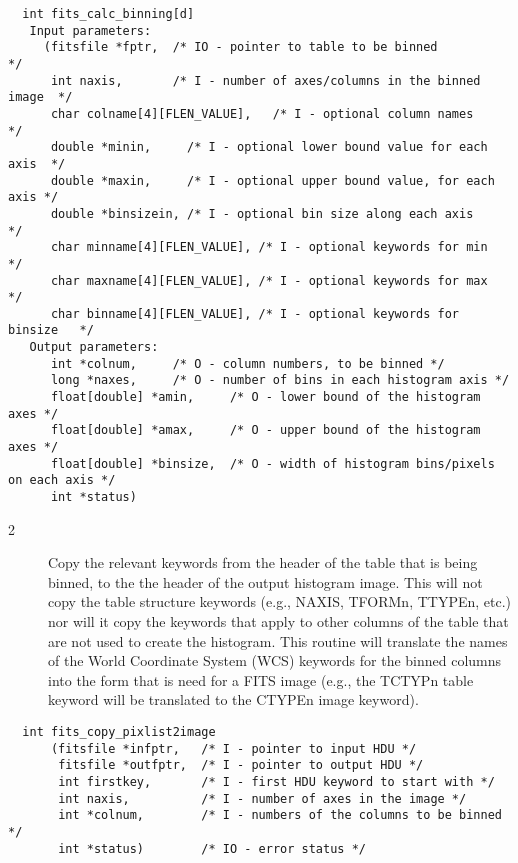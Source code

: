 \documentclass[11pt]{book}
\begin{document}
\begin{verbatim}
  int fits_calc_binning[d]
   Input parameters:
     (fitsfile *fptr,  /* IO - pointer to table to be binned              */
      int naxis,       /* I - number of axes/columns in the binned image  */
      char colname[4][FLEN_VALUE],   /* I - optional column names         */
      double *minin,     /* I - optional lower bound value for each axis  */
      double *maxin,     /* I - optional upper bound value, for each axis */
      double *binsizein, /* I - optional bin size along each axis         */
      char minname[4][FLEN_VALUE], /* I - optional keywords for min       */
      char maxname[4][FLEN_VALUE], /* I - optional keywords for max       */
      char binname[4][FLEN_VALUE], /* I - optional keywords for binsize   */
   Output parameters:
      int *colnum,     /* O - column numbers, to be binned */
      long *naxes,     /* O - number of bins in each histogram axis */
      float[double] *amin,     /* O - lower bound of the histogram axes */
      float[double] *amax,     /* O - upper bound of the histogram axes */
      float[double] *binsize,  /* O - width of histogram bins/pixels on each axis */
      int *status)
\end{verbatim}


\begin{description}
\item[2 ] Copy the relevant keywords from the header of the table that is being
binned, to the the header of the output histogram image.  This will not
copy the table structure keywords (e.g., NAXIS, TFORMn, TTYPEn, etc.) nor
will it copy the keywords that apply to other columns of the table that are
not used to create the histogram.  This routine will translate the names of
the World Coordinate System (WCS) keywords for the binned columns into the
form that is need for a FITS image (e.g., the TCTYPn table keyword will
be translated to the CTYPEn image keyword).
 \label{copypixlist2image}
\end{description}

\begin{verbatim}
  int fits_copy_pixlist2image
      (fitsfile *infptr,   /* I - pointer to input HDU */
       fitsfile *outfptr,  /* I - pointer to output HDU */
       int firstkey,       /* I - first HDU keyword to start with */
       int naxis,          /* I - number of axes in the image */
       int *colnum,        /* I - numbers of the columns to be binned  */
       int *status)        /* IO - error status */
\end{verbatim}
\end{document}

